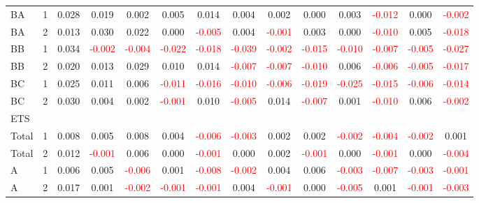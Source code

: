 \begin{table}[H]
{\begin{tabular}{llcccccccccccc}
BA & 1 & 0.028 & 0.019 & 0.002 & 0.005 & 0.014 & 0.004 & 0.002 & 0.000 & 0.003 & \textcolor{red}{-0.012} & 0.000 & \textcolor{red}{-0.002}\\
BA & 2 & 0.013 & 0.030 & 0.022 & 0.000 & \textcolor{red}{-0.005} & 0.004 & \textcolor{red}{-0.001} & 0.003 & 0.000 & \textcolor{red}{-0.010} & 0.005 & \textcolor{red}{-0.018}\\
BB & 1 & 0.034 & \textcolor{red}{-0.002} & \textcolor{red}{-0.004} & \textcolor{red}{-0.022} & \textcolor{red}{-0.018} & \textcolor{red}{-0.039} & \textcolor{red}{-0.002} & \textcolor{red}{-0.015} & \textcolor{red}{-0.010} & \textcolor{red}{-0.007} & \textcolor{red}{-0.005} & \textcolor{red}{-0.027}\\
BB & 2 & 0.020 & 0.013 & 0.029 & 0.010 & 0.014 & \textcolor{red}{-0.007} & \textcolor{red}{-0.007} & \textcolor{red}{-0.010} & 0.006 & \textcolor{red}{-0.006} & \textcolor{red}{-0.005} & \textcolor{red}{-0.017}\\
BC & 1 & 0.025 & 0.011 & 0.006 & \textcolor{red}{-0.011} & \textcolor{red}{-0.016} & \textcolor{red}{-0.010} & \textcolor{red}{-0.006} & \textcolor{red}{-0.019} & \textcolor{red}{-0.025} & \textcolor{red}{-0.015} & \textcolor{red}{-0.006} & \textcolor{red}{-0.014}\\
BC & 2 & 0.030 & 0.004 & 0.002 & \textcolor{red}{-0.001} & 0.010 & \textcolor{red}{-0.005} & 0.014 & \textcolor{red}{-0.007} & 0.001 & \textcolor{red}{-0.010} & 0.006 & \textcolor{red}{-0.002}\\
\hline
ETS &  &  &  &  &  &  &  &  &  &  &  &  & \\
\hline
Total & 1 & 0.008 & 0.005 & 0.008 & 0.004 & \textcolor{red}{-0.006} & \textcolor{red}{-0.003} & 0.002 & 0.002 & \textcolor{red}{-0.002} & \textcolor{red}{-0.004} & \textcolor{red}{-0.002} & 0.001\\
Total & 2 & 0.012 & \textcolor{red}{-0.001} & 0.006 & 0.000 & \textcolor{red}{-0.001} & 0.000 & 0.002 & \textcolor{red}{-0.001} & 0.000 & \textcolor{red}{-0.001} & 0.000 & \textcolor{red}{-0.004}\\
A & 1 & 0.006 & 0.005 & \textcolor{red}{-0.006} & 0.001 & \textcolor{red}{-0.008} & \textcolor{red}{-0.002} & 0.004 & 0.006 & \textcolor{red}{-0.003} & \textcolor{red}{-0.007} & \textcolor{red}{-0.003} & \textcolor{red}{-0.001}\\
A & 2 & 0.017 & 0.001 & \textcolor{red}{-0.002} & \textcolor{red}{-0.001} & \textcolor{red}{-0.001} & 0.004 & \textcolor{red}{-0.001} & 0.000 & \textcolor{red}{-0.005} & 0.001 & \textcolor{red}{-0.001} & \textcolor{red}{-0.003}\\

\end{tabular}}
\end{table}
